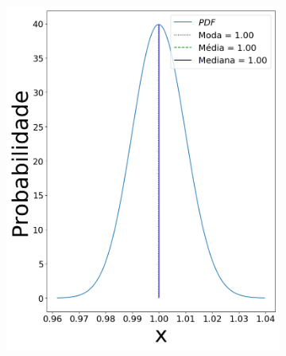 \begin{figure}[H]
	\centering
	\begin{subfigure}[b]{0.3\textwidth}
		\centering 
		\includegraphics[width=\textwidth]{./figuras/log_sigma_001.png}
		\caption{}
		\label{fig:sig001}
	\end{subfigure}
	\hfill
	\begin{subfigure}[b]{0.3\textwidth}
		\centering 

\end{subfigure}
\end{figure}
